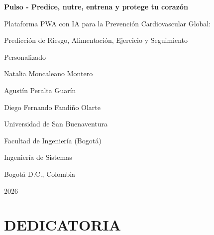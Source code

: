 \documentclass[12pt,letterpaper]{article}
\begin{document}
\begin{titlepage}
\centering
\vspace*{1cm}

{\LARGE\bfseries Pulso - Predice, nutre, entrena y protege tu corazón\par}

\vspace{1.5cm}

{\large Plataforma PWA con IA para la Prevención Cardiovascular Global:\par}
\vspace{0.4cm}
{\large Predicción de Riesgo, Alimentación, Ejercicio y Seguimiento\par}
\vspace{0.4cm}
{\large Personalizado\par}

\vspace{2.5cm}

{\large Natalia Moncaleano Montero\par}
\vspace{0.4cm}
{\large Agustín Peralta Guarín\par}
\vspace{0.4cm}
{\large Diego Fernando Fandiño Olarte\par}

\vspace{2.5cm}

{\large Universidad de San Buenaventura\par}
\vspace{0.4cm}
{\large Facultad de Ingeniería (Bogotá)\par}
\vspace{0.4cm}
{\large Ingeniería de Sistemas\par}
\vspace{0.4cm}
{\large Bogotá D.C., Colombia\par}
\vspace{0.4cm}
{\large 2026\par}

\vfill
\end{titlepage}

\setcounter{page}{1}

\section*{DEDICATORIA}
\end{document}
